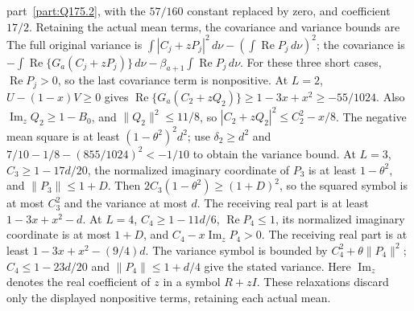 part~\ref{part:Q175.2}, with the $57/160$ constant replaced by zero,
and coefficient $17/2$.
Retaining the actual mean terms, the covariance and variance bounds are
The full original variance is
$\int|C_j+zP_j|^2\,\allowbreak d\nu-(\int\operatorname{Re}P_j\,\allowbreak d\nu)^2$;
the covariance is
$-\int\operatorname{Re}\{G_a(C_j+zP_j)\}\,d\nu
-\beta_{a+1}\int\operatorname{Re}P_j\,d\nu$.
For these three short cases, $\operatorname{Re}P_j>\allowbreak 0$, so the last
covariance term is nonpositive.
At $L=\allowbreak 2$, $U-(1-x)V\ge\allowbreak 0$ gives
$\operatorname{Re}\{G_a(C_2+zQ_2)\}\ge\allowbreak 1-3x+x^2\ge\allowbreak -55/1024$.
Also $\operatorname{Im}_{z}Q_2\ge\allowbreak 1-B_0$, and $\|Q_2\|^2\le\allowbreak 11/8$,
so $|C_2+zQ_2|^2\le\allowbreak  C_2^2-x/8$.
The negative mean square is at least $(1-\theta^2)^2d^2$;
use $\delta_2\ge\allowbreak  d^2$ and
$7/10-1/8-(855/1024)^2<\allowbreak -1/10$ to obtain the variance bound.
At $L=\allowbreak 3$, $C_3\ge\allowbreak 1-17d/20$, the normalized imaginary coordinate of
$P_3$ is at least $1-\theta^2$, and $\|P_3\|\le\allowbreak 1+D$.
Then $2C_3(1-\theta^2)\ge\allowbreak (1+D)^2$, so the squared symbol is at most
$C_3^2$ and the variance at most $d$.
The receiving real part is at least $1-3x+x^2-d$.
At $L=\allowbreak 4$, $C_4\ge\allowbreak 1-11d/6$, $\operatorname{Re}P_4\le\allowbreak 1$, its
normalized imaginary coordinate is at most $1+D$, and
$C_4-x\operatorname{Im}_{z}P_4>\allowbreak 0$.
The receiving real part is at least $1-3x+x^2-(9/4)d$.
The variance symbol is bounded by $C_4^2+\theta\|P_4\|^2$;
$C_4\le\allowbreak 1-23d/20$ and $\|P_4\|\le\allowbreak 1+d/4$ give the stated variance.
Here $\operatorname{Im}_{z}$ denotes the real coefficient of $z$
in a symbol $R+zI$. These relaxations discard only the displayed
nonpositive terms, retaining each actual mean.

